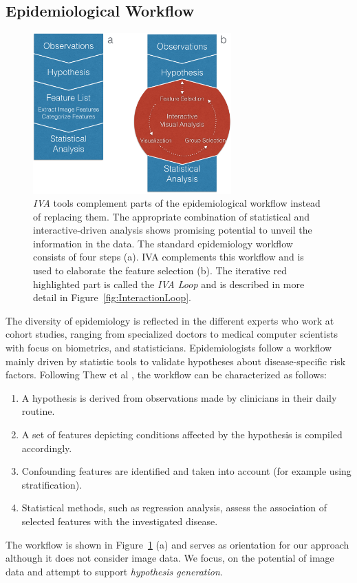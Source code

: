 \documentclass[journal]{style/vgtc} 			          %
\begin{document}
\subsection{Epidemiological Workflow} \label{EpidemiologicalWorkflow}
\begin{figure}[htb]
 \centering
 \includegraphics[width=3.0in]{figures/workflow_comparison}
 \caption{\emph{IVA} tools complement parts of the epidemiological workflow instead of replacing them.
 The appropriate combination of statistical and interactive-driven analysis shows promising potential to unveil the information in the data.
 The standard epidemiology workflow consists of four steps (a).
 IVA complements this workflow and is used to elaborate the feature selection (b).
 The iterative red highlighted part is called the \emph{IVA Loop} and is described in more detail in Figure~\ref{fig:InteractionLoop}.
 }
  \label{fig:WorkflowComparison}
\end{figure}
The diversity of epidemiology is reflected in the different experts who work at cohort studies, ranging from specialized doctors to medical computer scientists with focus on biometrics, and statisticians.
%
Epidemiologists follow a workflow mainly driven by statistic tools to validate hypotheses about disease-specific risk factors.
%
Following Thew et al \cite{Thew2009}, the workflow can be characterized as follows:
%
\begin{enumerate}
	\item A hypothesis is derived from observations made by clinicians in their daily routine.
%
	\item A set of features depicting conditions affected by the hypothesis is compiled accordingly.
%
	\item Confounding features are identified and taken into account (for example using stratification).
%
	\item Statistical methods, such as regression analysis, assess the association of selected features with the investigated disease.
%
\end{enumerate}
The workflow is shown in Figure~\ref{fig:WorkflowComparison} (a) and serves as orientation for our approach although it does not consider image data.
%
We focus, on the potential of image data and attempt to support \emph{hypothesis generation}.
\end{document}
